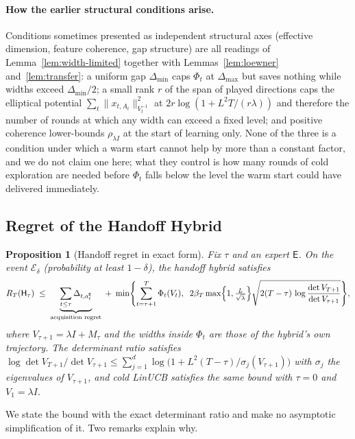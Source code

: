 \documentclass{article}
\newtheorem{proposition}{Proposition}
\theoremstyle{definition}
\theoremstyle{remark}
\theoremstyle{remark}
\newcommand{\Exp}{\mathsf{E}}
\newcommand{\Hyb}{\mathsf{H}}
\begin{document}
\paragraph{How the earlier structural conditions arise.}
Conditions sometimes presented as independent structural axes
(effective dimension, feature coherence, gap structure) are all readings of
Lemma~\ref{lem:width-limited} together with Lemmas~\ref{lem:loewner}
and~\ref{lem:transfer}: a uniform gap $\Delta_{\min}$ caps $\Phi_t$ at
$\Delta_{\max}$ but saves nothing while widths exceed $\Delta_{\min}/2$; a small
rank $r$ of the span of played directions caps the elliptical potential
$\sum_t\|x_{t,A_t}\|^2_{V_t^{-1}}$ at $2r\log(1+L^2T/(r\lambda))$ and therefore
the number of rounds at which any width can exceed a fixed level; and positive
coherence lower-bounds $\rho_{\lambda I}$ at the start of learning only. None
of the three is a condition under which a warm start cannot help by more than
a constant factor, and we do not claim one here; what they control is how
many rounds of cold exploration are needed before $\Phi_t$ falls below the
level the warm start could have delivered immediately.


\subsection{Regret of the Handoff Hybrid}
\label{sec:handoff}

\begin{proposition}[Handoff regret in exact form]
\label{thm:handoff}
Fix $\tau$ and an expert $\Exp$. On the event $\mathcal E_\delta$ (probability
at least $1-\delta$), the handoff hybrid satisfies
\begin{equation}
\label{eq:handoff-bound}
R_T(\Hyb_\tau)\;\le\;
\underbrace{\sum_{t\le\tau}\Delta_{t,a_t^{\Exp}}}_{\text{acquisition regret}}
\;+\;
\min\Biggl\{\sum_{t=\tau+1}^{T}\Phi_t(V_t),\;\;
2\beta_T\max\Bigl\{1,\tfrac{L}{\sqrt\lambda}\Bigr\}\sqrt{2(T-\tau)\,\log\frac{\det V_{T+1}}{\det V_{\tau+1}}}\Biggr\},
\end{equation}
where $V_{\tau+1}=\lambda I+M_\tau$ and the widths inside $\Phi_t$ are those
of the hybrid's own trajectory. The determinant ratio satisfies
$\log\det V_{T+1}/\det V_{\tau+1}\le\sum_{j=1}^{d}\log\bigl(1+L^2(T-\tau)/\sigma_j(V_{\tau+1})\bigr)$
with $\sigma_j$ the eigenvalues of $V_{\tau+1}$, and cold LinUCB satisfies the
same bound with $\tau=0$ and $V_1=\lambda I$.
\end{proposition}

We state the bound with the exact determinant ratio and make no asymptotic
simplification of it. Two remarks explain why.
\end{document}
